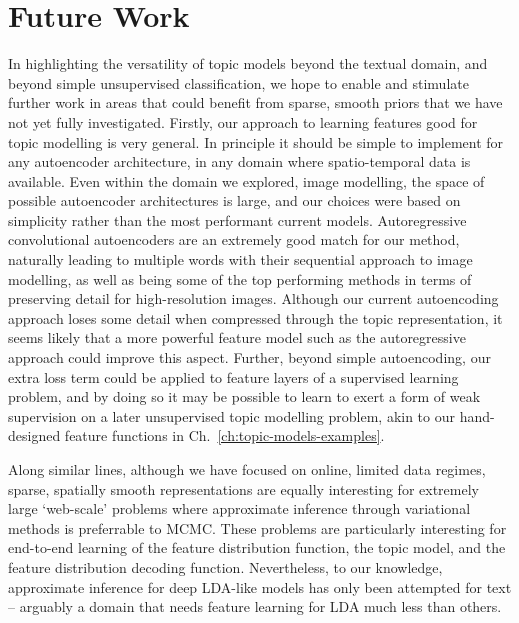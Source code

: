 \section{Future Work}
In highlighting the versatility of topic models beyond the textual domain, and beyond simple unsupervised classification, we hope to enable and stimulate further work in areas that could benefit from sparse, smooth priors that we have not yet fully investigated. Firstly, our approach to learning features good for topic modelling is very general. In principle it should be simple to implement for any autoencoder architecture, in any domain where spatio-temporal data is available. Even within the domain we explored, image modelling, the space of possible autoencoder architectures is large, and our choices were based on simplicity rather than the most performant current models. Autoregressive convolutional autoencoders are an extremely good match for our method, naturally leading to multiple words with their sequential approach to image modelling, as well as being some of the top performing methods in terms of preserving detail for high-resolution images. Although our current autoencoding approach loses some detail when compressed through the topic representation, it seems likely that a more powerful feature model such as the autoregressive approach could improve this aspect. Further, beyond simple autoencoding, our extra loss term could be applied to feature layers of a supervised learning problem, and by doing so it may be possible to learn to exert a form of weak supervision on a later unsupervised topic modelling problem, akin to our hand-designed feature functions in Ch.~\ref{ch:topic-models-examples}.

Along similar lines, although we have focused on online, limited data regimes, sparse, spatially smooth representations are equally interesting for extremely large `web-scale' problems where approximate inference through variational methods is preferrable to MCMC. These problems are particularly interesting for end-to-end learning of the feature distribution function, the topic model, and the feature distribution decoding function. Nevertheless, to our knowledge, approximate inference for deep LDA-like models has only been attempted for text -- arguably a domain that needs feature learning for LDA much less than others.

